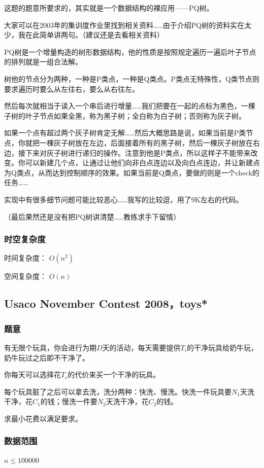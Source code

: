 \documentclass{ctexart}
\begin{document}
这题的题意所要求的，其实就是一个数据结构的裸应用——PQ树。

大家可以在2003年的集训度作业里找到相关资料……由于介绍PQ树的资料实在太少，我在此简单讲两句。（建议还是去看相关资料）

PQ树是一个增量构造的树形数据结构，他的性质是按照规定遍历一遍后叶子节点的排列就是一组合法解。

树他的节点分为两种，一种是P类点，一种是Q类点。P类点无特殊性，Q类节点则要求遍历时要么从左往右，要么从右往左。

然后每次就相当于读入一个串后进行增量……我们把要在一起的点标为黑色，一棵子树的叶子节点如果全黑，称为黑子树；全白称为白子树；否则称为灰子树。

如果一个点有超过两个灰子树肯定无解……然后大概思路是说，如果当前是P类节点，你就把一棵灰子树放在左边，后面接着所有的黑子树，然后一棵灰子树放在右边，接下来对灰子树进行递归的操作。注意到他是P类点，所以这样子不能带来改变。你可以新建几个点，让通过让他们向非白点连边以及向白点连边，并让新建点为Q类点，从而达到控制顺序的效果。如果当前是Q类点，要做的则是一个check的任务……

实现中有很多细节问题可能比较恶心……我写的比较逗，用了9K左右的代码。

（最后果然还是没有把PQ树讲清楚……教练求手下留情）
\subsubsection{时空复杂度}
时间复杂度： $O(n^2)$

空间复杂度： $O(n)$
\subsection{Usaco November Contest 2008，toys*}
\subsubsection{题意}
有无限个玩具，你会进行为期$D$天的活动，每天需要提供$T_i$的干净玩具给奶牛玩，奶牛玩过之后即不干净了。

你每天可以选择花$T_c$的代价来买一个干净的玩具。

每个玩具脏了之后可以拿去洗，洗分两种：快洗、慢洗。快洗一件玩具要$N_1$天洗干净，花$C_1$的钱；慢洗一件要$N_2$天洗干净，花$C_2$的钱。

求最小花费以满足要求。
\subsubsection{数据范围}
$n \le 100000$
\end{document}
